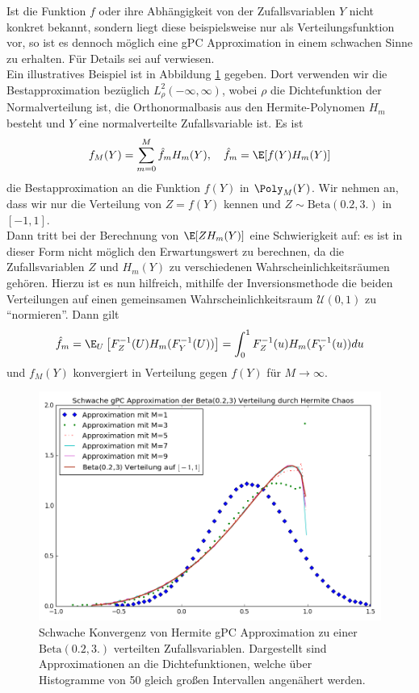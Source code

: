 \begin{mathbem}
Ist die Funktion $f$ oder ihre Abhängigkeit von der Zufallsvariablen $Y$ nicht konkret bekannt, sondern liegt diese beispielsweise nur als Verteilungsfunktion vor, so ist es dennoch möglich eine gPC Approximation in einem schwachen Sinne zu erhalten. Für Details sei auf \autocite[Kapitel 5.1.2]{dongbinxiu2010} verwiesen.\\
Ein illustratives Beispiel ist in Abbildung \ref{fig:gpcweakconv} gegeben. Dort verwenden wir die Bestapproximation bezüglich $L_\rho^2(-\infty,\infty)$, wobei $\rho$ die Dichtefunktion der Normalverteilung ist, die Orthonormalbasis aus den Hermite-Polynomen $H_m$ besteht und $Y$ eine normalverteilte Zufallsvariable ist. Es ist
\[f_M(Y)=\sum_{m=0}^M\hat{f}_mH_m(Y), \quad \hat{f}_m=\E[f(Y)H_m(Y)]\]
die Bestapproximation an die Funktion $f(Y)$ in $\Poly_M(Y)$. Wir nehmen an, dass wir nur die Verteilung von $Z=f(Y)$ kennen und $Z\sim\text{Beta}(0.2,3.)$ in $[-1,1]$.\\
Dann tritt bei der Berechnung von $\E[ZH_m(Y)]$ eine Schwierigkeit auf: es ist in dieser Form nicht möglich den Erwartungswert zu berechnen, da die Zufallsvariablen $Z$ und $H_m(Y)$ zu verschiedenen Wahrscheinlichkeitsräumen gehören. Hierzu ist es nun hilfreich, mithilfe der Inversionsmethode die beiden Verteilungen auf einen gemeinsamen Wahrscheinlichkeitsraum $\mathcal{U}(0,1)$ zu "`normieren"'. Dann gilt
\[\hat{f}_m=\E_U\left[F_Z^{-1}(U)H_m(F_Y^{-1}(U))\right]=\int_0^1F_Z^{-1}(u)H_m(F_Y^{-1}(u))du\]
und $f_M(Y)$ konvergiert in Verteilung gegen $f(Y)$ für $M\to\infty$.
\begin{figure}[!htb]
\includegraphics[width=\textwidth]{Figures/gpc_weak_convergence.png}
\caption{Schwache Konvergenz von Hermite gPC Approximation zu einer $\text{Beta}(0.2,3.)$ verteilten Zufallsvariablen. Dargestellt sind Approximationen an die Dichtefunktionen, welche über Histogramme von 50 gleich großen Intervallen angenähert werden.}
\label{fig:gpcweakconv}
\end{figure}
\end{mathbem}

